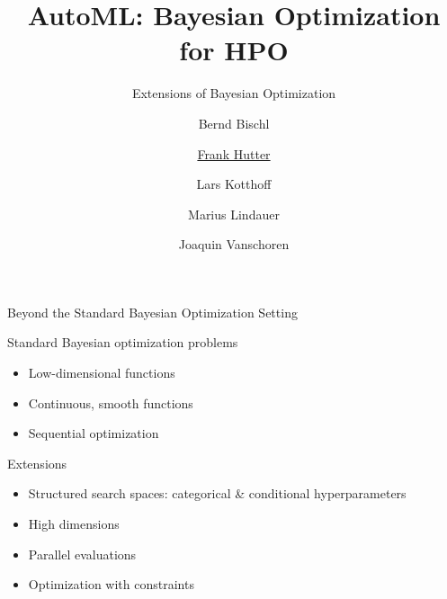 


\title{AutoML: Bayesian Optimization for HPO}
\subtitle{Extensions of Bayesian Optimization}
\author[Marius Lindauer]{Bernd Bischl \and \underline{Frank Hutter} \and Lars Kotthoff\newline \and Marius Lindauer \and Joaquin Vanschoren}
\institute{}
\date{}
    
    
    

\maketitle

\begin{frame}{Beyond the Standard Bayesian Optimization Setting}
\begin{block}{Standard Bayesian optimization problems}
\begin{itemize}
    \item Low-dimensional functions
    \item Continuous, smooth functions
    \item Sequential optimization
\end{itemize}
\end{block}
\medskip
\begin{block}{Extensions}
\begin{itemize}
    \item Structured search spaces: categorical \& conditional hyperparameters 
	\item High dimensions
    \item Parallel evaluations
    \item Optimization with constraints
\end{itemize}
\end{block}    
\end{frame}

